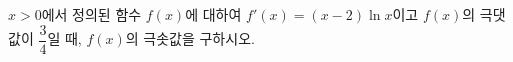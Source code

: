 \hspace*{2mm}\begin{minipage}[t]{\dimexpr\linewidth-2mm\relax}\vspace{0pt}
$x>0$에서 정의된 함수 $f(x)$에 대하여 $f'(x)=(x-2)\ln x$이고 $f(x)$의 극댓값이 $\dfrac{3}{4}$일 때, $f(x)$의 극솟값을 구하시오.\end{minipage}

